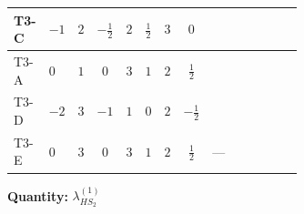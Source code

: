 \documentclass[8pt]{article}
\begin{document}
\begin{landscape}
\begin{longtable}{@{}llcccccc >{\raggedright\arraybackslash}p{0.21\linewidth} >{\raggedright\arraybackslash}p{0.21\linewidth} >{\raggedright\arraybackslash}p{0.21\linewidth}@{}}
\midrule
T3-C & $-1$ & $2$ & $-\frac{1}{2}$ & $2$ & $\frac{1}{2}$ & $3$ & $0$ & \scriptsize\adjustbox{max width=\linewidth}{$\begin{gathered} +4 {\lambda_{12}^{(1)}} {\lambda_{HS_1}^{(1)}}\end{gathered}$} & \scriptsize\adjustbox{max width=\linewidth}{$\begin{gathered} +6 {\lambda_1} {\lambda_{HS_2}^{(1)}}\end{gathered}$} & \scriptsize\adjustbox{max width=\linewidth}{$\begin{gathered} +4 {\lambda_{HS_2}^{(1)}}^2\end{gathered}$} \\
\midrule
T3-A & $0$ & $1$ & $0$ & $3$ & $1$ & $2$ & $\frac{1}{2}$ & \scriptsize\adjustbox{max width=\linewidth}{$\begin{gathered} +2 {\lambda_{12}^{(1)}} {\lambda_{HS_1}^{(1)}}\end{gathered}$} & \scriptsize\adjustbox{max width=\linewidth}{$\begin{gathered} +6 {\lambda_1} {\lambda_{HS_2}^{(1)}}\end{gathered}$} & \scriptsize\adjustbox{max width=\linewidth}{$\begin{gathered} +4 {\lambda_{HS_2}^{(1)}}^2\end{gathered}$} \\
\midrule
T3-D & $-2$ & $3$ & $-1$ & $1$ & $0$ & $2$ & $-\frac{1}{2}$ & \scriptsize\adjustbox{max width=\linewidth}{$\begin{gathered} +6 {\lambda_{12}^{(1)}} {\lambda_{HS_1}^{(1)}}\end{gathered}$} & \scriptsize\adjustbox{max width=\linewidth}{$\begin{gathered} +6 {\lambda_1} {\lambda_{HS_2}^{(1)}}\end{gathered}$} & \scriptsize\adjustbox{max width=\linewidth}{$\begin{gathered} +4 {\lambda_{HS_2}^{(1)}}^2\end{gathered}$} \\
\midrule
T3-E & $0$ & $3$ & $0$ & $3$ & $1$ & $2$ & $\frac{1}{2}$ & --- & \scriptsize\adjustbox{max width=\linewidth}{$\begin{gathered} +6 {\lambda_1} {\lambda_{HS_2}^{(1)}}\end{gathered}$} & \scriptsize\adjustbox{max width=\linewidth}{$\begin{gathered} +4 {\lambda_{HS_2}^{(1)}}^2\end{gathered}$} \\
\midrule
\bottomrule
\end{longtable}
\clearpage
\noindent\textbf{Quantity: }$\lambda_{HS_2}^{(1)}$\par\smallskip

\end{landscape}
\end{document}
